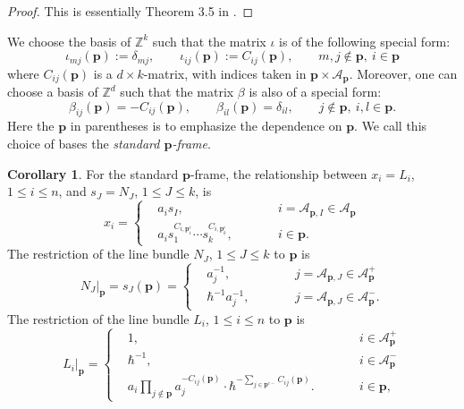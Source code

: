 \documentclass[10pt]{amsart}
\theoremstyle{definition}
\def\ZZ{{\mathbb{Z}}}
\newcommand{\bp}{\mathbf{p}}
\newcommand{\cA}{\mathcal{A}}
\theoremstyle{definition}
\numberwithin{equation}{section}
\theoremstyle{Theorem}
\newtheorem{Corollary}[Definition]{Corollary}
\begin{document}
\begin{proof}
This is essentially Theorem 3.5 in \cite{HH}.
\end{proof}

We choose the basis of $\ZZ^k$ such that the matrix $\iota$ is of the following special form:
\begin{equation} \label{V-frame-i}
\iota_{mj} (\bp) := \delta_{mj}, \qquad \iota_{ij} (\bp) := C_{ij} (\bp),  \qquad m, j \not\in \bp, \ i \in \bp
\end{equation}
where $C_{ij} (\bp)$ is a $d\times k$-matrix, with indices taken in $\bp \times \cA_\bp$. Moreover, one can choose a basis of $\ZZ^d$ such that the matrix $\beta$ is also of a special form:
\begin{equation} \label{V-frame-b}
\beta_{ij} (\bp) = -C_{ij} (\bp), \qquad \beta_{il} (\bp) = \delta_{il}, \qquad j \not\in \bp, \ i, l \in \bp.
\end{equation}
Here the $\bp$ in parentheses is to emphasize the dependence on $\bp$. We call this choice of bases the \emph{standard $\bp$-frame}.

\begin{Corollary}
For the standard $\bp$-frame, the relationship between $x_i = L_i$, $1\leq i\leq n$, and $s_J = N_J$, $1\leq J\leq k$, is
$$
x_i = \left\{ \begin{aligned}
& a_i s_I, \qquad && i = \cA_{\bp, I} \in \cA_\bp \\
& a_i s_1^{C_{i, \bp^c_1}} \cdots s_k^{C_{i, \bp^c_k}} , \qquad && i \in \bp.
\end{aligned} \right.
$$
The restriction of the line bundle $N_J$, $1\leq J\leq k$ to $\bp$ is
\begin{equation} \label{restriction-s(V)}
\left. N_J \right|_\bp = s_J (\bp) = \left\{ \begin{aligned}
& a_j^{-1}, \qquad && j = \cA_{\bp, J} \in \cA_\bp^+  \\
& \hbar^{-1} a_j^{-1} , \qquad && j = \cA_{\bp, J} \in \cA_\bp^-.
\end{aligned}\right.
\end{equation}
The restriction of the line bundle $L_i$, $1\leq i\leq n$ to $\bp$ is
\begin{equation} \label{restriction-V}
\left.  L_i \right|_\bp = \left\{ \begin{aligned}
& 1 , \qquad && i \in \cA_\bp^+ \\
& \hbar^{-1}, \qquad && i \in \cA_\bp^- \\
& a_i \prod_{j\not\in \bp} a_j^{-C_{ij} (\bp)} \cdot  \hbar^{- \sum_{j \in \bp^{c-}} C_{ij} (\bp) } .  \qquad && i \in \bp,
\end{aligned} \right.
\end{equation}
\end{Corollary}
\end{document}
